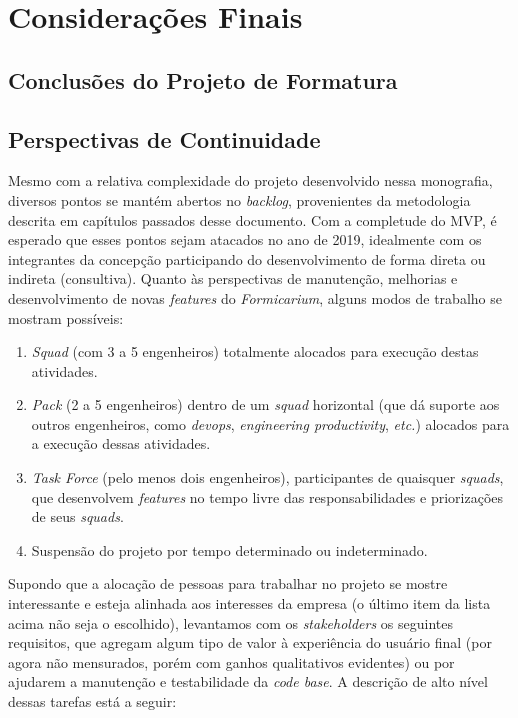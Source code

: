 \chapter{Considerações Finais}
	\section{Conclusões do Projeto de Formatura}
	\section{Perspectivas de Continuidade}
	Mesmo com a relativa complexidade do projeto desenvolvido nessa monografia, diversos pontos se mantém abertos no \textit{backlog}, provenientes da metodologia descrita em capítulos passados desse documento. Com a completude do MVP, é esperado que esses pontos sejam atacados no ano de 2019, idealmente com os integrantes da concepção participando do desenvolvimento de forma direta ou indireta (consultiva). Quanto às perspectivas de manutenção, melhorias e desenvolvimento de novas \textit{features} do \textit{Formicarium}, alguns modos de trabalho se mostram possíveis:
	\begin{enumerate}
	    \item \textit{Squad} (com 3 a 5 engenheiros) totalmente alocados para execução destas atividades.
	    \item \textit{Pack} (2 a 5 engenheiros) dentro de um \textit{squad} horizontal (que dá suporte aos outros engenheiros, como \textit{devops}, \textit{engineering productivity}, \textit{etc.}) alocados para a execução dessas atividades.
	    \item \textit{Task Force} (pelo menos dois engenheiros), participantes de quaisquer \textit{squads}, que desenvolvem \textit{features} no tempo livre das responsabilidades e priorizações de seus \textit{squads}.
	    \item Suspensão do projeto por tempo determinado ou indeterminado.
	\end{enumerate}
	
	Supondo que a alocação de pessoas para trabalhar no projeto se mostre interessante e esteja alinhada aos interesses da empresa (o último item da lista acima não seja o escolhido), levantamos com os \textit{stakeholders} os seguintes requisitos, que agregam algum tipo de valor à experiência do usuário final (por agora não mensurados, porém com ganhos qualitativos evidentes) ou por ajudarem a manutenção e testabilidade da \textit{code base}. A descrição de alto nível dessas tarefas está a seguir:
	
